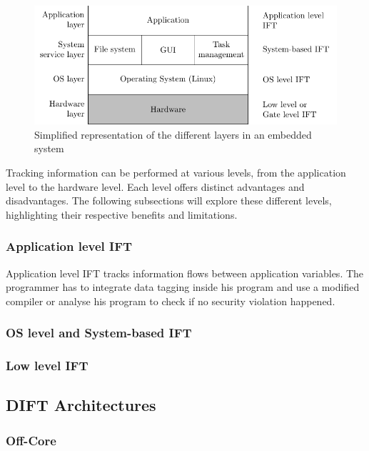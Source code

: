 \begin{figure}[ht]
    \centering
    \includegraphics{c2_soa/img/system_layer.pdf}
    \caption{Simplified representation of the different layers in an embedded system}
    \label{fig:levels_system}
\end{figure}

Tracking information can be performed at various levels, from the application level to the hardware level. Each level offers distinct advantages and disadvantages.
The following subsections will explore these different levels, highlighting their respective benefits and limitations.

\subsubsection{Application level IFT}
Application level IFT tracks information flows between application variables. The programmer has to integrate data tagging inside his program and use a modified compiler or analyse his program to check if no security violation happened.


\subsubsection{OS level and System-based IFT}
\subsubsection{Low level IFT}

\subsection{DIFT Architectures}
\subsubsection{Off-Core}

